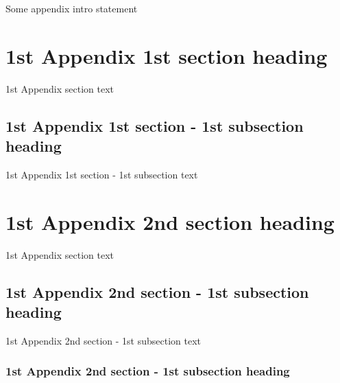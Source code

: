 Some appendix intro statement

\section[1st Appendix 1st section ToC title]{1st Appendix 1st section heading}

1st Appendix section text

\subsection[1st Appendix 1st section - 1st subsection ToC title]{1st Appendix 1st section - 1st subsection heading}

1st Appendix 1st section - 1st subsection text

\section[1st Appendix 2nd section ToC title]{1st Appendix 2nd section heading}

1st Appendix section text

\subsection[1st Appendix 2nd section - 1st subsection ToC title]{1st Appendix 2nd section - 1st subsection heading}

1st Appendix 2nd section - 1st subsection text
\subsubsection[1st Appendix 2nd section - 1st subsection ToC title]{1st Appendix 2nd section - 1st subsection heading}

\endinput 